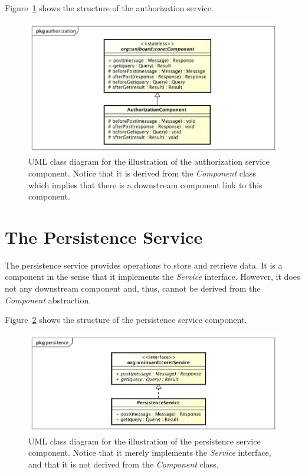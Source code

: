 \documentclass[oneside]{scrreprt}
\newcommand{\fig}[1]{Figure~\ref{#1}}
\begin{document}
\fig{fig:authorization-service} shows the structure of
the authorization service.

\begin{figure}[ht]
\centerline{
\includegraphics[width=1.0\textwidth]{figs/authorization-service}}
\caption{UML class diagram for the illustration of the
authorization service component. Notice that it is derived
from the \emph{Component} class which implies that there
is a downstream component link to this component.}
\label{fig:authorization-service}
\end{figure}


\section{The Persistence Service}

The persistence service provides operations to store and
retrieve data. It is a component in the sense that it
implements the \emph{Service} interface. However, it
does not any downstream component and, thus, cannot be
derived from the \emph{Component} abstraction.

\fig{fig:persistence-service} shows the structure of the persistence service
component.

\begin{figure}[ht]
\centerline{
\includegraphics[width=1.0\textwidth]{figs/persistence-service}}
\caption{UML class diagram for the illustration of the
persistence service component. Notice that it merely implements
the \emph{Service} interface, and that it is not derived
from the \emph{Component} class.}
\label{fig:persistence-service}
\end{figure}
\end{document}
